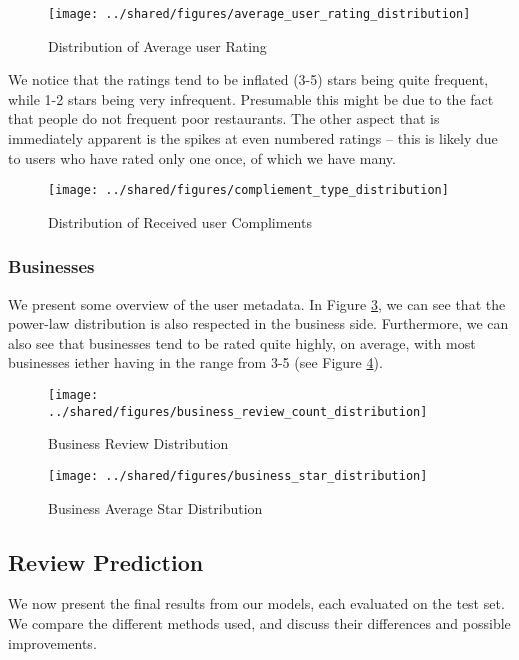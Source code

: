 \documentclass[letterpaper, 10 pt, conference]{ieeeconf}  %
\begin{document}
\begin{figure}[h!]
\centering
\texttt{[image: ../shared/figures/average\_user\_rating\_distribution]}
\caption{Distribution of Average user Rating}
\label{fig:user_rating_distribution}
\end{figure}

We notice that the ratings tend to be inflated (3-5) stars being quite frequent, while 1-2 stars being very infrequent. Presumable this might be due to the fact that people do not frequent poor restaurants. The other aspect that is immediately apparent is the spikes at even numbered ratings -- this is likely due to users who have rated only one once, of which we have many.

\begin{figure}[h!]
\centering
\texttt{[image: ../shared/figures/compliement\_type\_distribution]}
\caption{Distribution of Received user Compliments}
\label{fig:user_compliment_distribution}
\end{figure}

\subsubsection{Businesses}
We present some overview of the user metadata. In Figure \ref{fig:business_review_distribution}, we can see that the power-law distribution is also respected in the business side. Furthermore, we can also see that businesses tend to be rated quite highly, on average, with most businesses iether having in the range from 3-5 (see Figure \ref{fig:business_star_distribution}).

\begin{figure}[h!]
\centering
\texttt{[image: ../shared/figures/business\_review\_count\_distribution]}
\caption{Business Review Distribution}
\label{fig:business_review_distribution}
\end{figure}

\begin{figure}[h!]
\centering
\texttt{[image: ../shared/figures/business\_star\_distribution]}
\caption{Business Average Star Distribution}
\label{fig:business_star_distribution}
\end{figure}

\subsection{Review Prediction}
We now present the final results from our models, each evaluated on the test set. We compare the different methods used, and discuss their differences and possible improvements. 
\end{document}
